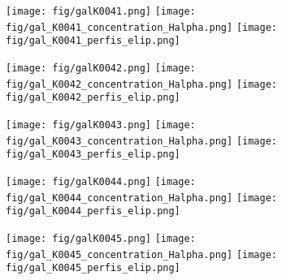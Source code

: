 \begin{figure}[!ht]
\begin{center}
\setcaptionmargin{1cm}
\texttt{[image: fig/galK0041.png]}
\texttt{[image: fig/gal\_K0041\_concentration\_Halpha.png]}
\texttt{[image: fig/gal\_K0041\_perfis\_elip.png]}
\end{center}
\end{figure}


\begin{figure}[!ht]
\begin{center}
\setcaptionmargin{1cm}
\texttt{[image: fig/galK0042.png]}
\texttt{[image: fig/gal\_K0042\_concentration\_Halpha.png]}
\texttt{[image: fig/gal\_K0042\_perfis\_elip.png]}
\end{center}
\end{figure}


\begin{figure}[!ht]
\begin{center}
\setcaptionmargin{1cm}
\texttt{[image: fig/galK0043.png]}
\texttt{[image: fig/gal\_K0043\_concentration\_Halpha.png]}
\texttt{[image: fig/gal\_K0043\_perfis\_elip.png]}
\end{center}
\end{figure}


\begin{figure}[!ht]
\begin{center}
\setcaptionmargin{1cm}
\texttt{[image: fig/galK0044.png]}
\texttt{[image: fig/gal\_K0044\_concentration\_Halpha.png]}
\texttt{[image: fig/gal\_K0044\_perfis\_elip.png]}
\end{center}
\end{figure}


\begin{figure}[!ht]
\begin{center}
\setcaptionmargin{1cm}
\texttt{[image: fig/galK0045.png]}
\texttt{[image: fig/gal\_K0045\_concentration\_Halpha.png]}
\texttt{[image: fig/gal\_K0045\_perfis\_elip.png]}
\end{center}
\end{figure}


